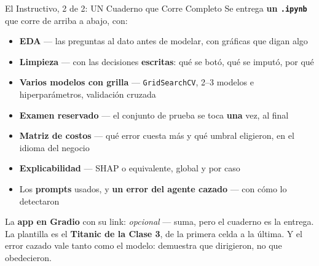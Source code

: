 \documentclass[aspectratio=169, 11pt]{beamer}
\begin{document}
\begin{frame}[shrink=8]{El Instructivo, 2 de 2: UN Cuaderno que Corre Completo}
  \vspace{-2pt}
  {\scriptsize\color{textMuted}
   Se entrega \textbf{un \texttt{.ipynb}} que corre de arriba a abajo, con:}
  \vspace{2pt}
  {\scriptsize\color{textMuted}
  \begin{itemize}\setlength{\itemsep}{2pt}
    \item[{\color{codeGreen}\scriptsize\faCheck}]
      \textbf{EDA} --- las preguntas al dato antes de modelar, con gráficas
      que digan algo
    \item[{\color{codeGreen}\scriptsize\faCheck}]
      \textbf{Limpieza} --- con las decisiones \textbf{escritas}: qué se
      botó, qué se imputó, por qué
    \item[{\color{codeGreen}\scriptsize\faCheck}]
      \textbf{Varios modelos con grilla} --- \texttt{GridSearchCV}, 2--3
      modelos e hiperparámetros, validación cruzada
    \item[{\color{codeGreen}\scriptsize\faCheck}]
      \textbf{Examen reservado} --- el conjunto de prueba se toca
      \textbf{una} vez, al final
    \item[{\color{codeGreen}\scriptsize\faCheck}]
      \textbf{Matriz de costos} --- qué error cuesta más y qué umbral
      eligieron, en el idioma del negocio
    \item[{\color{codeGreen}\scriptsize\faCheck}]
      \textbf{Explicabilidad} --- SHAP o equivalente, global y por caso
    \item[{\color{codeGreen}\scriptsize\faCheck}]
      Los \textbf{prompts} usados, y \textbf{un error del agente cazado}
      --- con cómo lo detectaron
  \end{itemize}}
  \vspace{3pt}
  \begin{tcolorbox}[colback=arcaGray, colframe=arcaDark, boxrule=0pt,
    leftrule=3pt, arc=3pt, left=8pt, right=8pt, top=3pt, bottom=3pt]
    {\scriptsize\color{textMuted}
     La \textbf{app en Gradio} con su link: \emph{opcional} --- suma, pero
     el cuaderno es la entrega. La plantilla es el \textbf{Titanic de la
     Clase 3}, de la primera celda a la última. Y el error cazado vale
     tanto como el modelo: demuestra que dirigieron, no que obedecieron.}
  \end{tcolorbox}
\end{frame}
\end{document}
